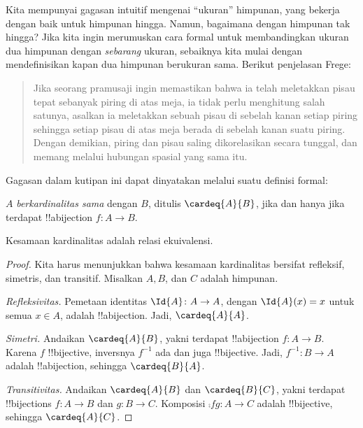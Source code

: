\documentclass[../../../include/open-logic-section]{subfiles}
\begin{document}


Kita mempunyai gagasan intuitif mengenai ``ukuran'' himpunan, yang bekerja
dengan baik untuk himpunan hingga. Namun, bagaimana dengan himpunan tak
hingga? Jika kita ingin merumuskan cara formal untuk membandingkan ukuran dua
himpunan dengan \emph{sebarang} ukuran, sebaiknya kita mulai dengan
mendefinisikan kapan dua himpunan berukuran sama. Berikut penjelasan Frege:
\begin{quote}
  Jika seorang pramusaji ingin memastikan bahwa ia telah meletakkan pisau
  tepat sebanyak piring di atas meja, ia tidak perlu menghitung salah satunya,
  asalkan ia meletakkan sebuah pisau di sebelah kanan setiap piring sehingga
  setiap pisau di atas meja berada di sebelah kanan suatu piring. Dengan
  demikian, piring dan pisau saling dikorelasikan secara tunggal, dan memang
  melalui hubungan spasial yang sama itu. \citep[\S70]{Frege1884}
\end{quote}
Gagasan dalam kutipan ini dapat dinyatakan melalui suatu definisi formal:

\begin{defn}
  $A$ \emph{berkardinalitas sama} dengan $B$, ditulis $\cardeq{A}{B}$, jika dan
  hanya jika terdapat !!a{bijection} $f \colon A \to B$.
\end{defn}

\begin{prop}
Kesamaan kardinalitas adalah relasi ekuivalensi.
\end{prop}

\begin{proof}
Kita harus menunjukkan bahwa kesamaan kardinalitas bersifat refleksif,
simetris, dan transitif. Misalkan $A, B$, dan $C$ adalah himpunan.

\emph{Refleksivitas.} Pemetaan identitas $\Id{A} \colon A \to A$, dengan
$\Id{A} (x) = x$ untuk semua $x \in A$, adalah !!a{bijection}. Jadi,
$\cardeq{A}{A}$.

\emph{Simetri.} Andaikan $\cardeq{A}{B}$, yakni terdapat !!a{bijection}
$f\colon A \to B$. Karena $f$ !!{bijective}, inversnya $f^{-1}$ ada dan juga
!!{bijective}. Jadi, $f^{-1}\colon B \to A$ adalah !!a{bijection}, sehingga
$\cardeq{B}{A}$.

\emph{Transitivitas.} Andaikan $\cardeq{A}{B}$ dan $\cardeq{B}{C}$, yakni
terdapat !!{bijection}s $f\colon A \to B$ dan $g\colon B \to C$. Komposisi
$\comp{f}{g}\colon A \to C$ adalah !!{bijective}, sehingga $\cardeq{A}{C}$.
\end{proof}
\end{document}
